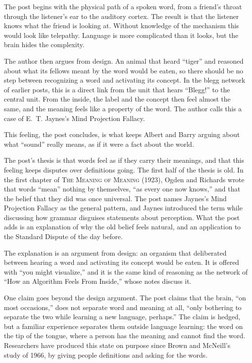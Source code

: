 \begin{afterword}
\summaryhead

The post begins with the physical path of a spoken word, from a friend's throat through the listener's ear to the auditory cortex. The result is that the listener knows what the friend is looking at. Without knowledge of the mechanism this would look like telepathy. Language is more complicated than it looks, but the brain hides the complexity.

The author then argues from design. An animal that heard ``tiger'' and reasoned about what its fellows meant by the word would be eaten, so there should be no step between recognizing a word and activating its concept. In the blegg network of earlier posts, this is a direct link from the unit that hears ``Blegg!'' to the central unit. From the inside, the label and the concept then feel almost the same, and the meaning feels like a property of the word. The author calls this a case of E.~T. Jaynes's Mind Projection Fallacy.

This feeling, the post concludes, is what keeps Albert and Barry arguing about what ``sound'' really means, as if it were a fact about the world.

\responsehead

The post's thesis is that words feel as if they carry their meanings, and that this feeling keeps disputes over definitions going. The first half of the thesis is old. In the first chapter of \textsc{The Meaning of Meaning} (1923), Ogden and Richards wrote that words ``mean'' nothing by themselves, ``as every one now knows,'' and that the belief that they did was once universal. The post names Jaynes's Mind Projection Fallacy as the general pattern, and Jaynes introduced the term while discussing how grammar disguises statements about perception. What the post adds is an explanation of why the old belief feels natural, and an application to the Standard Dispute of the day before.

The explanation is an argument from design: an organism that deliberated between hearing a word and activating its concept would be eaten. It is offered with ``you might visualize,'' and it is the same kind of reasoning as the network of ``How an Algorithm Feels From Inside,'' whose notes discuss it.

One claim goes beyond the design argument. The post claims that the brain, ``on most occasions,'' does not separate word and meaning at all, ``only bothering to separate the two while learning a new language, perhaps.'' The claim is hedged, but a familiar experience separates them outside language learning: the word on the tip of the tongue, where a person has the meaning and cannot find the word. Researchers have produced this state on purpose since Brown and McNeill's study of 1966, by giving people definitions and asking for the words.


\end{afterword}
